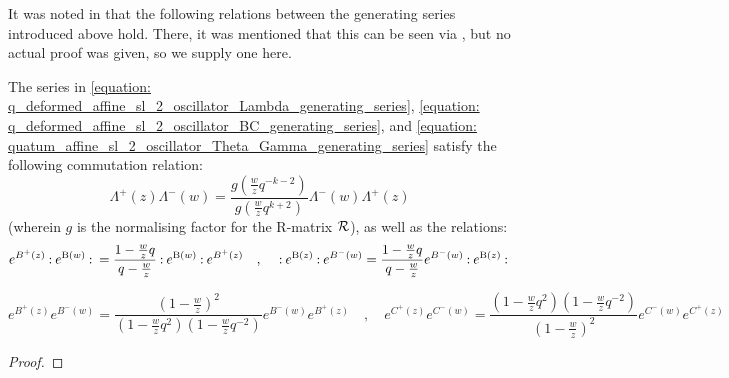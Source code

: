         It was noted in \cite{frenkel_reshetikhin_affine_QUEs_and_deformed_virasoro_and_finite_W_algebras} that the following relations between the generating series introduced above hold. There, it was mentioned that this can be seen via \cite{awata_odake_shiraishi_free_boson_realisation_of_quantum_affine_sl_N}, but no actual proof was given, so we supply one here.
        \begin{lemma} \label{lemma: q_deformed_affine_sl_2_oscillator_generating_series_commutation_relations}
            The series in \eqref{equation: q_deformed_affine_sl_2_oscillator_Lambda_generating_series}, \eqref{equation: q_deformed_affine_sl_2_oscillator_BC_generating_series}, and \eqref{equation: quatum_affine_sl_2_oscillator_Theta_Gamma_generating_series} satisfy the following commutation relation:
                \begin{equation} \label{equation: q_deformed_affine_sl_2_oscillator_Lambda_generating_series_commutators}
                    \Lambda^+(z) \Lambda^-(w) = \frac{ g\left( \frac{w}{z} q^{-k - 2} \right) }{ g\left( \frac{w}{z} q^{k + 2} \right) } \Lambda^-(w) \Lambda^+(z)
                \end{equation}
            (wherein $g$ is the normalising factor for the R-matrix $\mathcal{R}$), as well as the relations:
                \begin{equation} \label{equation: q_deformed_affine_sl_2_oscillator_BC_generating_series_commutators}
                    e^{ B^+(z) } \: \mathbf{:} \: { e^{\mathrm{B}(w)} }  \: \mathbf{:} \: = \frac{ 1 - \frac{w}{z} q }{ q - \frac{w}{z} } \: \mathbf{:} \: { e^{\mathrm{B}(w)} }  \: \mathbf{:} \: e^{ B^+(z) }
                    \quad, \quad
                    \: \mathbf{:} \: { e^{ \mathrm{B}(z) } }  \: \mathbf{:} \: e^{ B^-(w) } = \frac{ 1 - \frac{w}{z} q }{ q - \frac{w}{z} } e^{B^-(w)} \: \mathbf{:} \: { e^{ \mathrm{B}(z) } }  \: \mathbf{:} \:
                \end{equation}
                
                \begin{equation} \label{equation: quatum_affine_sl_2_oscillator_Theta_Gamma_generating_series_commutators}
                    e^{B^+(z)} e^{B^-(w)} = \frac{ \left(1 - \frac{w}{z}\right)^2 }{ \left( 1 - \frac{w}{z} q^2 \right) \left( 1 - \frac{w}{z} q^{-2} \right) } e^{B^-(w)} e^{B^+(z)}
                    \quad, \quad
                    e^{C^+(z)} e^{C^-(w)} = \frac{ \left( 1 - \frac{w}{z} q^2 \right) \left( 1 - \frac{w}{z} q^{-2} \right) }{ \left(1 - \frac{w}{z}\right)^2 } e^{C^-(w)} e^{C^+(z)}
                \end{equation}
        \end{lemma}
            \begin{proof}
                
            \end{proof}


